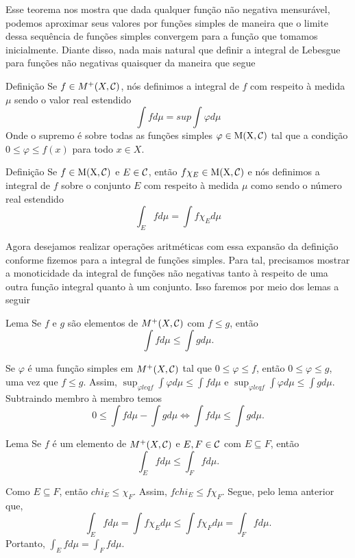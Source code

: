 Esse teorema nos mostra que dada qualquer função não negativa mensurável, podemos aproximar seus valores por funções simples de maneira que o limite dessa sequência de funções simples convergem para a função que tomamos inicialmente.
Diante disso, nada mais natural que definir a integral de Lebesgue para funções não negativas quaisquer da maneira que segue
\begin{env}{Definição}
	\label{def:integral de uma função qualquer não negativa}
	Se $f \in M^+(X,\operatorname{\mathcal{C}})$, nós definimos a integral de $f$ com respeito à medida $\mu$ sendo o valor real estendido
	$$
	\int f d\mu = sup \int \varphi d\mu
	$$
	Onde o supremo é sobre todas as funções simples $\varphi \in \operatorname{M(X, \mathcal{C} )}$ tal que a condição $0 \leq \varphi \leq f(x)$ para todo $x \in X$. 
\end{env}

\begin{env}{Definição}
	\label{def: integral de uma função não neg com respeito a um conjunto específico}
	Se $f \in \operatorname{M(X, \mathcal{C} )}$ e $E \in \operatorname{\mathcal{C}}$, então $f\chi_{E} \in \operatorname{M(X, \mathcal{C} )}$ e nós definimos a integral de $f$ sobre o conjunto $E$ com respeito à medida $\mu$ como sendo o número real estendido
	$$
	\int_E f d\mu = \int f\chi_E d\mu
	$$
\end{env}

Agora desejamos realizar operações aritméticas com essa expansão da definição conforme fizemos para a integral de funções simples.
Para tal, precisamos mostrar a monoticidade da integral de funções não negativas tanto à respeito de uma outra função integral quanto à um conjunto.
Isso faremos por meio dos lemas a seguir

\begin{env}{Lema}
	\label{lem:monoticiadade da integral de funções não negativas}
	Se $f$ e $g$ são elementos de $M^+(X,\operatorname{\mathcal{C}})$ com $f \leq g$, então 
	$$
	\int fd\mu \leq \int g d\mu.
	$$
\end{env}
\begin{prova}
	Se $\varphi$ é uma função simples em $M^+(X,\operatorname{\mathcal{C}})$ tal que 
	$0 \leq \varphi \leq f$, então $0 \leq \varphi \leq g$, uma vez que $f \leq g$.
	Assim, 
	$\sup_{\varphi leq f} \int\varphi d\mu \leq \int f d\mu$ e
	$\sup_{\varphi leq f} \int\varphi d\mu \leq \int g d\mu$.
	Subtraindo membro à membro temos 
	$$
	0 \leq  \int f d\mu  - \int g d\mu
	\Leftrightarrow
	\int f d\mu \leq \int g d\mu.
	$$
	
\end{prova}
\begin{env}{Lema}
	\label{lem:monoticiadade da integral com conjunto em funções não negativas}
	Se $f$ é um elemento de $M^+(X,\operatorname{\mathcal{C}})$ e $E,F \in \operatorname{\mathcal{C}}$ com $E \subseteq F$, então 
	$$
	\int_E fd\mu \leq \int_F f d\mu.
	$$
\end{env}
\begin{prova}
	Como $E \subseteq F$, então $chi_E \leq \chi_F$.
	Assim, $fchi_E \leq f\chi_F$.
	Segue, pelo lema anterior que, 
	$$
	\int_E f d\mu 
	=
	\int f\chi_E d\mu
	\leq 
	\int f\chi_F d\mu
	=
	\int_F f d\mu.
	$$
	Portanto, $ \displaystyle 
	\int_E f d\mu 
	=
	\int_F f d\mu.
	$
\end{prova}

